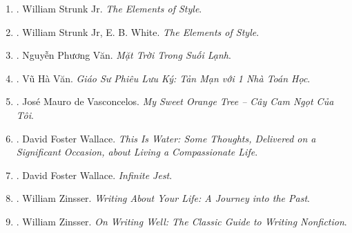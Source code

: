 \documentclass{article}
\begin{document}
\begin{enumerate}
	\item \cite{Strunk1918}. William Strunk Jr. {\it The Elements of Style}.\hfill{\sf[done]}
	\item \cite{Strunk_White2019}. William Strunk Jr, E. B. White. {\it The Elements of Style}.\hfill{\sf[done]}
	\item \cite{Van2022}. Nguyễn Phương Văn. {\it Mặt Trời Trong Suối Lạnh}.\hfill{\sf[done]}
	\item \cite{VanVu2022}. Vũ Hà Văn. {\it Giáo Sư Phiêu Lưu Ký: Tản Mạn với 1 Nhà Toán Học}.\hfill{\sf[done]}
	\item \cite{Vasconcelos_orange_tree}. Jos\'e Mauro de Vasconcelos. {\it My Sweet Orange Tree -- Cây Cam Ngọt Của Tôi}.\hfill{\sf[done]}
	\item \cite{Wallace2009}. David Foster Wallace. {\it This Is Water: Some Thoughts, Delivered on a Significant Occasion, about Living a Compassionate Life}.\hfill{\sf[done]}
	\item \cite{Wallace2011}. David Foster Wallace. {\it Infinite Jest}.\hfill{\sf[reading]}
	\item \cite{Zinsser2005}. William Zinsser. {\it Writing About Your Life: A Journey into the Past}.
	\item \cite{Zinsser2016}. William Zinsser. {\it On Writing Well: The Classic Guide to Writing Nonfiction}.\hfill{\sf[reading]}
\end{enumerate}

\end{document}
